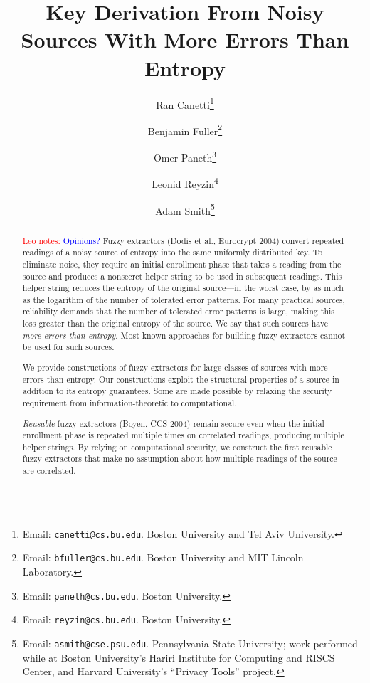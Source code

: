 \documentclass[11pt]{article}
\title{Key Derivation From Noisy Sources With More Errors Than Entropy}
\author{Ran Canetti\footnote{Email: {\tt canetti@cs.bu.edu}. Boston University and Tel Aviv University.} \and Benjamin Fuller\footnote{Email: {\tt bfuller@cs.bu.edu}.  Boston University and MIT Lincoln Laboratory.} \and Omer Paneth\footnote{Email: {\tt paneth@cs.bu.edu}. Boston University.} \and Leonid Reyzin\footnote{Email: {\tt reyzin@cs.bu.edu}.  Boston University.} \and Adam Smith\footnote{Email: {\tt asmith@cse.psu.edu}.  Pennsylvania State University; work performed while at Boston University's Hariri Institute for Computing and RISCS Center, and Harvard University's
``Privacy Tools'' project.} }
\newcommand{\authnote}[2]{{\textcolor{red}{\textsf{#1 notes: }\textcolor{blue}{ #2}}\marginpar{\textcolor{red}{\textbf{!!!!!}}}}}
\newcommand{\authnote}[2]{}
\newcommand{\lnote}[1]{{\authnote{Leo}{#1}}}
\begin{document}
\maketitle


\begin{abstract}
\lnote{Opinions?}
Fuzzy extractors (Dodis et al., Eurocrypt 2004) convert repeated readings of a noisy source of entropy into the same uniformly distributed key. To eliminate noise, they require an initial enrollment phase that takes a reading from the source and produces a nonsecret helper string to be used in subsequent readings. This helper string reduces  the entropy of the original source---in the worst case, by as much as the logarithm of the number of tolerated error patterns. For many practical sources, reliability demands that the number of tolerated error patterns is large, making this loss greater than the original entropy of the source. We say that such sources have \emph{more errors than entropy}.  Most known approaches for building fuzzy extractors cannot be used for such sources.

%   

We provide constructions of fuzzy extractors for large classes of sources with more errors than entropy.  Our constructions exploit the structural properties of a source in addition to its entropy guarantees. Some are made possible by relaxing the security requirement from information-theoretic to computational.


\emph{Reusable} fuzzy extractors (Boyen, CCS 2004)
 remain secure even when the initial enrollment phase is repeated multiple times on correlated readings, producing multiple helper strings. By relying on computational security, we construct the first reusable fuzzy extractors that make no assumption about how multiple readings of the source are correlated.



\end{abstract}
\end{document}
